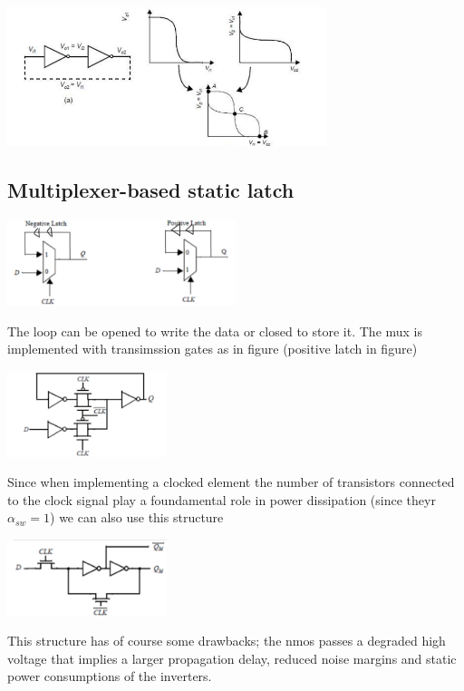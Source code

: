 \centering
\includegraphics[width=0.7\textwidth]{C10_7.png}\\
\raggedright

\subsection{Multiplexer-based static latch}

\centering
\includegraphics[width=0.5\textwidth]{C10_8.png}\\
\raggedright

The loop can be opened to write the data or closed to store it. The mux is implemented with transimssion gates as in figure (positive latch in figure)

\centering
\includegraphics[width=0.35\textwidth]{C10_9.png}\\
\raggedright

Since when implementing a clocked element the number of transistors connected to the clock signal play a foundamental role in power dissipation (since theyr $\alpha_{sw}=1$) we can also use this structure

\centering
\includegraphics[width=0.35\textwidth]{C10_10.png}\\
\raggedright

This structure has of course some drawbacks; the nmos passes a degraded high voltage that implies a larger propagation delay, reduced noise margins and static power consumptions of the inverters.\\


